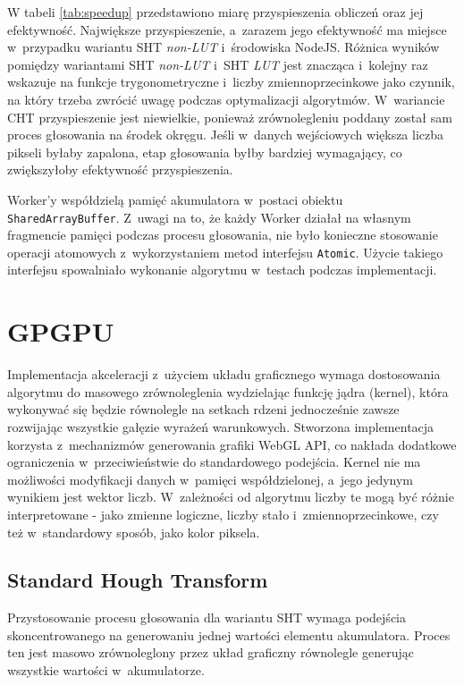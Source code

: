 W tabeli \ref{tab:speedup} przedstawiono miarę przyspieszenia obliczeń oraz jej efektywność. Największe przyspieszenie, a~zarazem jego efektywność ma miejsce w~przypadku wariantu SHT \textit{non-LUT} i~środowiska NodeJS. Różnica wyników pomiędzy wariantami SHT \textit{non-LUT} i~SHT \textit{LUT} jest znacząca i~kolejny raz wskazuje na funkcje trygonometryczne i~liczby zmiennoprzecinkowe jako czynnik, na który trzeba zwrócić uwagę podczas optymalizacji algorytmów. W~wariancie CHT przyspieszenie jest niewielkie, ponieważ zrównolegleniu poddany został sam proces głosowania na środek okręgu. Jeśli w~danych wejściowych większa liczba pikseli byłaby zapalona, etap głosowania byłby bardziej wymagający, co zwiększyłoby efektywność przyspieszenia.

Worker'y współdzielą pamięć akumulatora w~postaci obiektu \lstinline{SharedArrayBuffer}. Z~uwagi na to, że każdy Worker działał na własnym fragmencie pamięci podczas procesu głosowania, nie było konieczne stosowanie operacji atomowych z~wykorzystaniem metod interfejsu \lstinline{Atomic}. Użycie takiego interfejsu spowalniało wykonanie algorytmu w~testach podczas implementacji. 


\section{GPGPU}

Implementacja akceleracji z~użyciem układu graficznego wymaga dostosowania algorytmu do masowego zrównoleglenia wydzielając funkcję jądra (kernel), która wykonywać się będzie równolegle na setkach rdzeni jednocześnie zawsze rozwijając wszystkie gałęzie wyrażeń warunkowych. Stworzona implementacja korzysta z~mechanizmów generowania grafiki WebGL API, co nakłada dodatkowe ograniczenia w~przeciwieństwie do standardowego podejścia. Kernel nie ma możliwości modyfikacji danych w~pamięci współdzielonej, a~jego jedynym wynikiem jest wektor liczb. W~zależności od algorytmu liczby te mogą być różnie interpretowane - jako zmienne logiczne, liczby stało i~zmiennoprzecinkowe, czy też w~standardowy sposób, jako kolor piksela.

\subsection{Standard Hough Transform}

Przystosowanie procesu głosowania dla wariantu SHT wymaga podejścia skoncentrowanego na generowaniu jednej wartości elementu akumulatora. Proces ten jest masowo zrównoleglony przez układ graficzny równolegle generując wszystkie wartości w~akumulatorze. 

